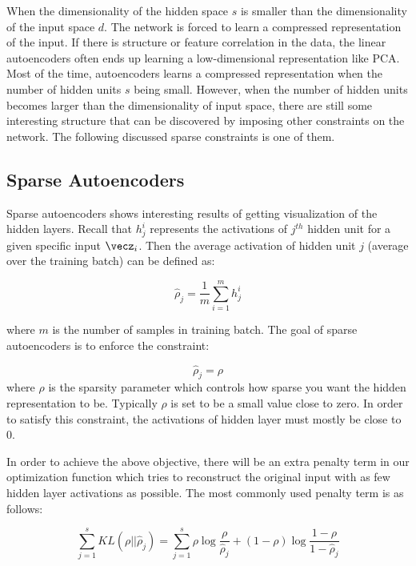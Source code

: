 When the dimensionality of the hidden space $s$ is smaller than the dimensionality of the input space $d$. The network is forced to learn a compressed representation of the input. If there is structure or feature correlation in the data, the linear autoencoders often ends up learning a low-dimensional representation like PCA. Most of the time, autoencoders learns a compressed representation when the number of hidden units $s$ being small. However, when the number of hidden units becomes larger than the dimensionality of input space, there are still some interesting structure that can be discovered by imposing other constraints on the network. The following discussed sparse constraints is one of them.   





\subsection{Sparse Autoencoders}
Sparse autoencoders \cite{andrew_sparse,Alireza} shows interesting results of getting visualization of the hidden layers. Recall that $h_j^i$ represents the activations of $j^{th}$ hidden unit for a given specific input $\vecz_i$. Then the average activation of hidden unit $j$ (average over the training batch) can be defined as:

\begin{equation}\label{eq:rho_hat_j}
    \hat{\rho}_j = \frac{1}{m}\sum_{i=1}^m h_j^i
\end{equation}

\noindent where $m$ is the number of samples in training batch. The goal of sparse autoencoders is to enforce the constraint: 

\begin{equation}\label{eq:sparse_goal}
\hat{\rho}_j = \rho
\end{equation}
\noindent where $\rho$ is the sparsity parameter which controls how sparse you want the hidden representation to be. Typically $\rho$ is set to be a small value close to zero. In order to satisfy this constraint, the activations of hidden layer must mostly be close to $0$.

In order to achieve the above objective, there will be an extra penalty term in our optimization function which tries to reconstruct the original input with as few hidden layer activations as possible. The most commonly used penalty term \cite{andrew_sparse} is as follows:

\begin{equation}\label{eq:KL_sparse}
    \sum_{j=1}^s KL(\rho||\hat{\rho}_j)= \sum_{j=1}^s \rho\log\frac{\rho}{\hat{\rho}_j} + (1-\rho)\log\frac{1-\rho}{1-\hat{\rho}_j}
\end{equation}

